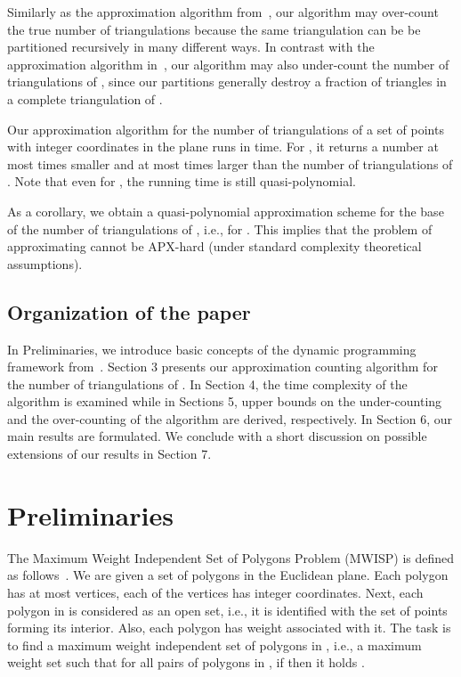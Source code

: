 \documentclass[a4paper]{article}
\begin{document}
Similarly as the approximation algorithm
from~\cite{ABRS13}, our algorithm may over-count
the true number of triangulations
because the same triangulation can
be be partitioned recursively in many different
ways. In contrast with the approximation algorithm in~\cite{ABRS13},
our  algorithm may also under-count the
number of triangulations of , since our
partitions generally destroy a fraction
of triangles in a complete triangulation of .

Our approximation
algorithm for 
the number of triangulations of a set 
of  points with integer coordinates in the plane
runs 
in  time.
For , it returns
a number at most  times
smaller and at most  times
larger than the number of triangulations
of . Note that even for 
,
the running time is still quasi-polynomial.

As a corollary, we obtain
 a quasi-polynomial approximation
scheme for the base of the number of triangulations
of , i.e., for .
This implies that the problem of
approximating  cannot be
APX-hard (under standard complexity theoretical
assumptions).

\subsection{Organization of the paper}
In Preliminaries, we introduce 
basic concepts of the dynamic programming
framework from~\cite{AW13}. Section 3 presents
our approximation counting algorithm for the number
of triangulations of . In Section 4,
the time complexity of the algorithm is
examined while in Sections 5, upper bounds
on the under-counting and the over-counting
of the algorithm are derived, respectively.
In Section 6, our main results are formulated.
We conclude with a short discussion on
possible extensions of our results in Section 7.

\section{Preliminaries}

The Maximum Weight Independent Set of Polygons Problem
(MWISP) is defined as follows~\cite{AW14}.
We are given a set   of  polygons in the Euclidean plane.
Each polygon has at most  vertices, each of the vertices
has integer coordinates. Next, each polygon  in 
is considered
as an open set, i.e., it is identified with the set
of points forming its interior. Also, each polygon 
 has weight  associated with it. The task
is to find a maximum weight independent set of polygons
in , i.e., a maximum weight set  such that for all
pairs  of polygons in , if 
then it holds .
\end{document}
